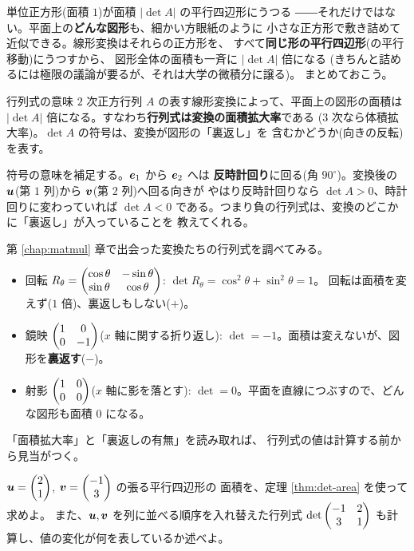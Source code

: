 単位正方形(面積 $1$)が面積 $|\det A|$ の平行四辺形にうつる
――それだけではない。平面上の\textbf{どんな図形}も、細かい方眼紙のように
小さな正方形で敷き詰めて近似できる。線形変換はそれらの正方形を、
すべて\textbf{同じ形の平行四辺形}(の平行移動)にうつすから、
図形全体の面積も一斉に $|\det A|$ 倍になる
(きちんと詰めるには極限の議論が要るが、それは大学の微積分に譲る)。
まとめておこう。

\begin{itembox}[l]{行列式の意味}
$2$ 次正方行列 $A$ の表す線形変換によって、平面上の図形の面積は
$|\det A|$ 倍になる。すなわち\textbf{行列式は変換の面積拡大率}である
($3$ 次なら体積拡大率)。$\det A$ の符号は、変換が図形の「裏返し」を
含むかどうか(向きの反転)を表す。
\end{itembox}

符号の意味を補足する。$\bm{e}_1$ から $\bm{e}_2$ へは
\textbf{反時計回り}に回る(角 $90^\circ$)。変換後の
$\bm{u}$(第 $1$ 列)から $\bm{v}$(第 $2$ 列)へ回る向きが
やはり反時計回りなら $\det A > 0$、時計回りに変わっていれば $\det A < 0$
である。つまり負の行列式は、変換のどこかに「裏返し」が入っていることを
教えてくれる。

\begin{rei}[回転・鏡映・射影の行列式]\label{rei:det-trans}
第 \ref{chap:matmul} 章で出会った変換たちの行列式を調べてみる。
\begin{itemize}
\item 回転 $R_\theta = \begin{pmatrix}\cos\theta & -\sin\theta \\ \sin\theta & \cos\theta\end{pmatrix}$:
$\det R_\theta = \cos^2\theta + \sin^2\theta = 1$。
回転は面積を変えず($1$ 倍)、裏返しもしない($+$)。
\item 鏡映 $\begin{pmatrix}1 & 0 \\ 0 & -1\end{pmatrix}$($x$ 軸に関する折り返し):
$\det = -1$。面積は変えないが、図形を\textbf{裏返す}($-$)。
\item 射影 $\begin{pmatrix}1 & 0 \\ 0 & 0\end{pmatrix}$($x$ 軸に影を落とす):
$\det = 0$。平面を直線につぶすので、どんな図形も面積 $0$ になる。
\end{itemize}
「面積拡大率」と「裏返しの有無」を読み取れば、
行列式の値は計算する前から見当がつく。
\end{rei}

\begin{mondai}\label{q:det-area}
$\bm{u} = \begin{pmatrix}2 \\ 1\end{pmatrix}$, $\bm{v} = \begin{pmatrix}-1 \\ 3\end{pmatrix}$ の張る平行四辺形の
面積を、定理 \ref{thm:det-area} を使って求めよ。
また、$\bm{u}, \bm{v}$ を列に並べる順序を入れ替えた行列式
$\det \begin{pmatrix}-1 & 2 \\ 3 & 1\end{pmatrix}$ も計算し、値の変化が何を表しているか述べよ。
\end{mondai}

